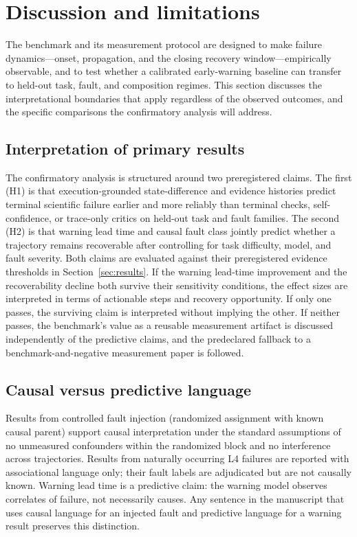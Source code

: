 \section{Discussion and limitations}
\label{sec:discussion}

The benchmark and its measurement protocol are designed to make failure
dynamics—onset, propagation, and the closing recovery window—empirically
observable, and to test whether a calibrated early-warning baseline can
transfer to held-out task, fault, and composition regimes. This section
discusses the interpretational boundaries that apply regardless of the
observed outcomes, and the specific comparisons the confirmatory analysis
will address.

\subsection{Interpretation of primary results}

The confirmatory analysis is structured around two preregistered claims.
The first (H1) is that execution-grounded state-difference and evidence
histories predict terminal scientific failure earlier and more reliably
than terminal checks, self-confidence, or trace-only critics on held-out
task and fault families. The second (H2) is that warning lead time and
causal fault class jointly predict whether a trajectory remains
recoverable after controlling for task difficulty, model, and fault
severity. Both claims are evaluated against their preregistered evidence
thresholds in Section~\ref{sec:results}. If the warning lead-time
improvement and the recoverability decline both survive their sensitivity
conditions, the effect sizes are interpreted in terms of actionable steps
and recovery opportunity. If only one passes, the surviving claim is
interpreted without implying the other. If neither passes, the benchmark's
value as a reusable measurement artifact is discussed independently of the
predictive claims, and the predeclared fallback to a benchmark-and-negative
measurement paper is followed.

\subsection{Causal versus predictive language}

Results from controlled fault injection (randomized assignment with known
causal parent) support causal interpretation under the standard assumptions
of no unmeasured confounders within the randomized block and no interference
across trajectories. Results from naturally occurring L4 failures are
reported with associational language only; their fault labels are
adjudicated but are not causally known. Warning lead time is a predictive
claim: the warning model observes correlates of failure, not necessarily
causes. Any sentence in the manuscript that uses causal language for an
injected fault and predictive language for a warning result preserves this
distinction.

